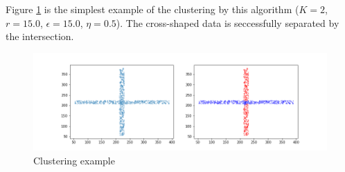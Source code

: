 Figure \ref{cross} is the simplest example of the clustering by this algorithm ($K = 2$, $r = 15.0$, $\epsilon = 15.0$, $\eta = 0.5$). The cross-shaped data is seccessfully separated by the intersection.

\begin{figure}[htbp]
\centering
\vspace{-1em}
\includegraphics[width=0.8  \textwidth]{cross_shaped.png}
\vspace{-1em}
\caption{Clustering example}
\label{cross}
\end{figure}


%   